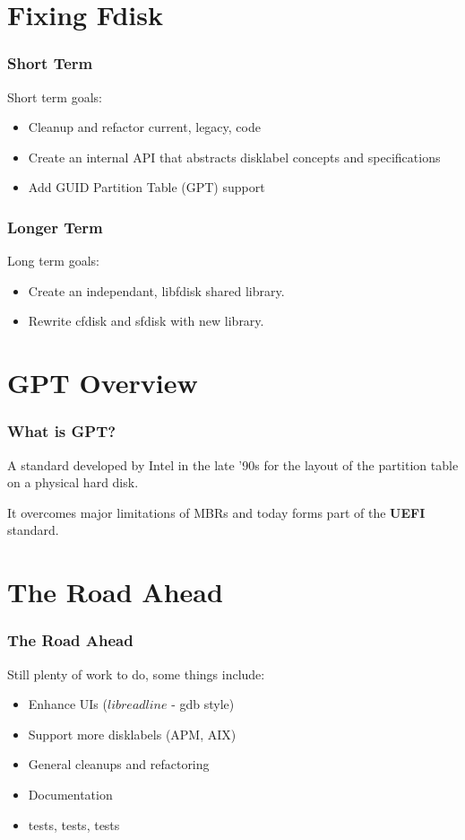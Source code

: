 \documentclass{beamer}
\begin{document}
\section{Fixing Fdisk}
\begin{frame}\frametitle{Short Term}
  Short term goals:
  \begin{itemize}
  \item Cleanup and refactor current, legacy, code
  \item Create an internal API that abstracts disklabel concepts and specifications
  \item Add GUID Partition Table (GPT) support
  \end{itemize} 
\end{frame}

\begin{frame}\frametitle{Longer Term}
  Long term goals:
  \begin{itemize}
  \item Create an independant, libfdisk shared library.
  \item Rewrite cfdisk and sfdisk with new library.
  \end{itemize} 
\end{frame}

\section{GPT Overview}
\begin{frame}\frametitle{What is GPT?}
  A standard developed by Intel in the late '90s for the layout of the partition table on a physical hard disk.\newline

  It overcomes major limitations of MBRs and today forms part of the \textbf{UEFI} standard.
\end{frame}

\section{The Road Ahead}
\begin{frame}\frametitle{The Road Ahead}
  Still plenty of work to do, some things include:
 \begin{itemize}
  \item Enhance UIs ($libreadline$ - gdb style)
  \item Support more disklabels (APM, AIX)
  \item General cleanups and refactoring
  \item Documentation
  \item tests, tests, tests
  \end{itemize} 
\end{frame}
\end{document}
